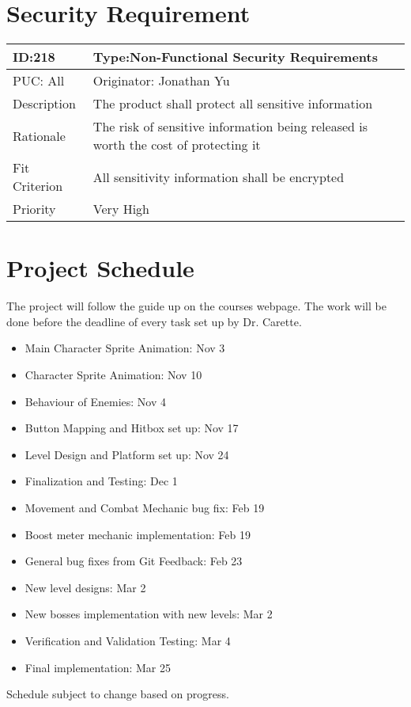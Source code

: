 \documentclass{article}
\begin{document}
	
	
	\section{Security Requirement}
	
		\begin{table}[H]
			\begin{tabular}{|l|l|l|}
				\hline
				ID:218 & \multicolumn{2}{l|}{Type:Non-Functional Security Requirements} \\ \hline
				PUC: All & \multicolumn{2}{l|}{Originator: Jonathan Yu} \\ \hline
				Description & \multicolumn{2}{m{0.85\textwidth}|}{The product shall protect all sensitive information } \\ \hline
				Rationale & \multicolumn{2}{m{0.85\textwidth}|}{The risk of sensitive information being released is worth the cost of protecting it} \\ \hline
				Fit Criterion & \multicolumn{2}{m{0.85\textwidth}|}{ All sensitivity information shall be encrypted } \\ \hline
				Priority& \multicolumn{2}{m{0.85\textwidth}|}{Very High} \\ \hline
			\end{tabular}
		\end{table}
	

	\section{Project Schedule}
	The project will follow the guide up on the courses webpage. The work will be done before the deadline of every task set up by Dr. Carette.\\
	\begin{itemize}
		\item Main Character Sprite Animation: Nov 3
		\item Character Sprite Animation: Nov 10
		\item Behaviour of Enemies: Nov 4
		\item Button Mapping and Hitbox set up: Nov 17
		\item Level Design and Platform set up: Nov 24
		\item Finalization and Testing: Dec 1
		\item Movement and Combat Mechanic bug fix: Feb 19
		\item Boost meter mechanic implementation: Feb 19
		\item General bug fixes from Git Feedback: Feb 23
		\item New level designs: Mar 2
		\item New bosses implementation with new levels: Mar 2 
		\item Verification and Validation Testing: Mar 4
		\item Final implementation: Mar 25
	\end{itemize}
	Schedule subject to change based on progress.
\end{document}
